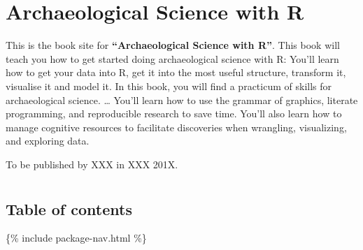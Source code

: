 \chapter{Archaeological Science with R}

This is the book site for \textbf{``Archaeological Science with R''}.
This book will teach you how to get started doing archaeological science
with R: You'll learn how to get your data into R, get it into the most
useful structure, transform it, visualise it and model it. In this book,
you will find a practicum of skills for archaeological science. \ldots{}
You'll learn how to use the grammar of graphics, literate programming,
and reproducible research to save time. You'll also learn how to manage
cognitive resources to facilitate discoveries when wrangling,
visualizing, and exploring data.

To be published by XXX in XXX 201X.

\chapter{}

\section{Table of contents}

\{\% include package-nav.html \%\}
